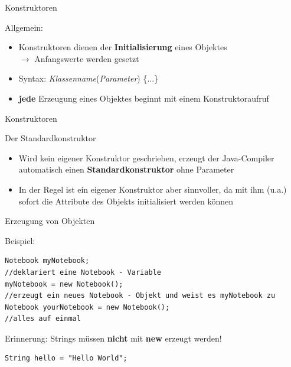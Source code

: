 \documentclass[18pt]{beamer}
\begin{document}
\begin{frame}{Konstruktoren}
\begin{block}{Allgemein:}
\begin{itemize}
	\item Konstruktoren dienen der \textbf{Initialisierung} eines Objektes\\
	$\rightarrow$ Anfangswerte werden gesetzt
	\item Syntax: \textit{Klassenname}(\textit{Parameter}) \{...\}
	\item \textbf{jede} Erzeugung eines Objektes beginnt mit einem Konstruktoraufruf
\end{itemize}
\end{block}
\end{frame}

\begin{frame}[fragile]{Konstruktoren}
\begin{block}{Der Standardkonstruktor}
\begin{itemize}
	\item Wird kein eigener Konstruktor geschrieben, erzeugt der Java-Compiler automatisch einen 		
		\textbf{Standardkonstruktor} ohne Parameter
	\item In der Regel ist ein eigener Konstruktor aber sinnvoller, da mit ihm (u.a.) sofort die Attribute des Objekts initialisiert werden 
		können
\end{itemize}
\end{block}
\end{frame}

\begin{frame}[fragile]{Erzeugung von Objekten}
\begin{exampleblock}{Beispiel:}
\begin{lstlisting}
Notebook myNotebook;			
//deklariert eine Notebook - Variable
myNotebook = new Notebook();	
//erzeugt ein neues Notebook - Objekt und weist es myNotebook zu
Notebook yourNotebook = new Notebook();	
//alles auf einmal
\end{lstlisting}
\end{exampleblock}
\pause
Erinnerung: Strings müssen \textbf{nicht} mit \textbf{new} erzeugt werden!
\begin{lstlisting}
String hello = "Hello World";
\end{lstlisting}
\end{frame}
\end{document}

